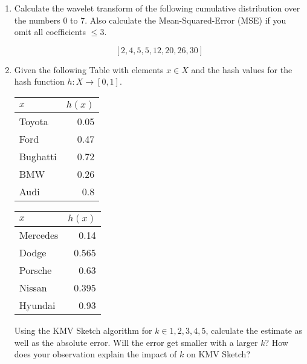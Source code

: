


\newcommand{\subtitle}{\textbf{Exercise 4}}
\newcommand{\outdate}{15.11.2021}
\newcommand{\duedate}{22.11.2021 16:00 CET}
\newcommand{\video}{024}






\begin{enumerate}
\item
  Calculate the wavelet transform of the following cumulative distribution over the numbers 0 to 7.
  Also calculate the Mean-Squared-Error (MSE) if you omit all coefficients $\leq 3$.

  $$[2, 4, 5, 5, 12, 20, 26, 30]$$

\item Given the following Table with elements $x \in X$ and the hash values for the hash function $h: X \rightarrow [0,1]$.\\

\begin{center}
\begin{minipage}{0.2\columnwidth}
\begin{tabular}{|l|r|} \hline
$x$  & $h(x)$ \\ \hline \hline
Toyota & 0.05 \\ \hline
Ford & 0.47 \\ \hline
Bughatti & 0.72 \\ \hline
BMW & 0.26 \\ \hline
Audi & 0.8 \\ \hline
\end{tabular}
\end{minipage}
\begin{minipage}{0.3\columnwidth}
\begin{tabular}{|l|r|} \hline
$x$  & $h(x)$ \\ \hline \hline
Mercedes & 0.14 \\ \hline
Dodge & 0.565 \\ \hline
Porsche & 0.63 \\ \hline
Nissan & 0.395 \\ \hline
Hyundai & 0.93 \\ \hline
\end{tabular}
\end{minipage}
\end{center}

Using the KMV Sketch algorithm for $ k \in {1, 2, 3, 4, 5} $, calculate the estimate as well as the absolute error. Will the error get smaller with a larger $ k $? How does your observation explain the impact of $ k $ on KMV Sketch?

\end{enumerate}

